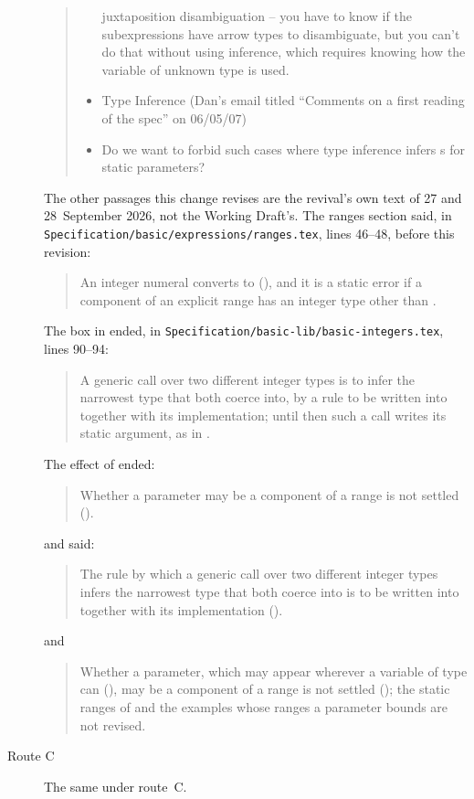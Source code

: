 \begin{description}
\begin{quote}
\begin{itemize}
juxtaposition disambiguation -- you have to know if the subexpressions have
arrow types to disambiguate, but you can't do that without using inference,
which requires knowing how the variable of unknown type is used.
\item Type Inference (Dan's email titled ``Comments on a first reading of the
spec'' on 06/05/07)
\item Do we want to forbid such cases where type inference infers
s for static parameters?
\end{itemize}
\end{quote}
The other passages this change revises are the revival's own text of 27 and
28~September 2026, not the Working Draft's.
The ranges section said, in
\nolinkurl{Specification/basic/expressions/ranges.tex}, lines 46--48, before
this revision:
\begin{quote}
An integer numeral converts to  (), and
it is a static error if a component of an explicit range has an integer type
other than .
\end{quote}
The box in  ended, in
\nolinkurl{Specification/basic-lib/basic-integers.tex}, lines 90--94:
\begin{quote}
A generic call over two different integer types is to infer the
narrowest type that both coerce into, by a rule to be written into
 together with its implementation; until then such a
call writes its static argument, as in
.
\end{quote}
The effect of  ended:
\begin{quote}
Whether a  parameter may be a component of a range is not settled
().
\end{quote}
and  said:
\begin{quote}
The rule by which a generic call over two different integer types
infers the narrowest type that both coerce into is to be written into
 together with its implementation
().
\end{quote}
and
\begin{quote}
Whether a  parameter, which may appear wherever a variable of type
 can (), may be a component of a range
is not settled (); the static ranges of
 and the examples whose ranges a  parameter bounds are
not revised.
\end{quote}
\item[Route C] The same under route~C.
\end{description}

